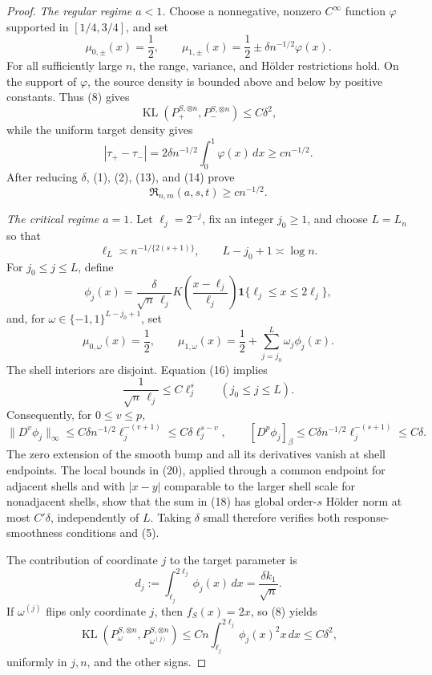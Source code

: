 \documentclass{article}
\begin{document}
\begin{proof}
\emph{The regular regime \(a<1\).}
Choose a nonnegative, nonzero \(C^\infty\) function \(\varphi\) supported in \([1/4,3/4]\), and set
\[
 \mu_{0,\pm}(x)=\frac12,
 \qquad
 \mu_{1,\pm}(x)=\frac12\pm\delta n^{-1/2}\varphi(x).
\tag{12}
\]
For all sufficiently large \(n\), the range, variance, and H\"older restrictions hold. On the support of \(\varphi\), the source density is bounded above and below by positive constants. Thus (8) gives
\[
 \operatorname{KL}(P_+^{S,\otimes n},P_-^{S,\otimes n})
 \le C\delta^2,
\tag{13}
\]
while the uniform target density gives
\[
 |\tau_+-\tau_-|
 =2\delta n^{-1/2}\int_0^1\varphi(x)\,dx
 \ge c n^{-1/2}.
\tag{14}
\]
After reducing \(\delta\), (1), (2), (13), and (14) prove
\[
 \mathfrak R_{n,m}(a,s,t)\ge c n^{-1/2}.
\tag{15}
\]

\emph{The critical regime \(a=1\).}
Let \(\ell_j=2^{-j}\), fix an integer \(j_0\ge1\), and choose \(L=L_n\) so that
\[
 \ell_L\asymp n^{-1/\{2(s+1)\}},
 \qquad L-j_0+1\asymp\log n.
\tag{16}
\]
For \(j_0\le j\le L\), define
\[
 \phi_j(x)=\frac{\delta}{\sqrt n\,\ell_j}
 K\!\left(\frac{x-\ell_j}{\ell_j}\right)
 \mathbf 1\{\ell_j\le x\le2\ell_j\},
\tag{17}
\]
and, for \(\omega\in\{-1,1\}^{L-j_0+1}\), set
\[
 \mu_{0,\omega}(x)=\frac12,
 \qquad
 \mu_{1,\omega}(x)=\frac12+
 \sum_{j=j_0}^L\omega_j\phi_j(x).
\tag{18}
\]
The shell interiors are disjoint. Equation (16) implies
\[
 \frac1{\sqrt n\,\ell_j}\le C\ell_j^s
 \qquad(j_0\le j\le L).
\tag{19}
\]
Consequently, for \(0\le v\le p\),
\[
 \lVert D^v\phi_j\rVert_\infty
 \le C\delta n^{-1/2}\ell_j^{-(v+1)}
 \le C\delta\ell_j^{s-v},
 \qquad
 [D^p\phi_j]_{\beta}
 \le C\delta n^{-1/2}\ell_j^{-(s+1)}
 \le C\delta.
\tag{20}
\]
The zero extension of the smooth bump and all its derivatives vanish at shell endpoints. The local bounds in (20), applied through a common endpoint for adjacent shells and with \(|x-y|\) comparable to the larger shell scale for nonadjacent shells, show that the sum in (18) has global order-\(s\) H\"older norm at most \(C'\delta\), independently of \(L\). Taking \(\delta\) small therefore verifies both response-smoothness conditions and (5).

The contribution of coordinate \(j\) to the target parameter is
\[
 d_j:=\int_{\ell_j}^{2\ell_j}\phi_j(x)\,dx
 =\frac{\delta k_1}{\sqrt n}.
\tag{21}
\]
If \(\omega^{(j)}\) flips only coordinate \(j\), then \(f_S(x)=2x\), so (8) yields
\[
 \operatorname{KL}(P_\omega^{S,\otimes n},
                    P_{\omega^{(j)}}^{S,\otimes n})
 \le Cn\int_{\ell_j}^{2\ell_j}\phi_j(x)^2x\,dx
 \le C\delta^2,
\tag{22}
\]
uniformly in \(j,n\), and the other signs.


\end{proof}
\end{document}
